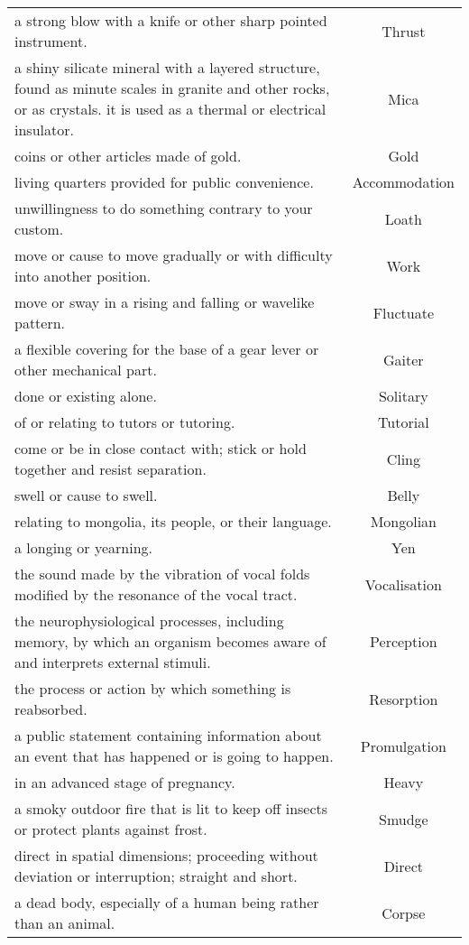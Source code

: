 \begin{longtable}{p{12cm}c}
a strong blow with a knife or other sharp pointed instrument. & Thrust\\
a shiny silicate mineral with a layered structure, found as minute scales in granite and other rocks, or as crystals. it is used as a thermal or electrical insulator. & Mica\\
coins or other articles made of gold. & Gold\\
living quarters provided for public convenience. & Accommodation\\
unwillingness to do something contrary to your custom. & Loath\\
move or cause to move gradually or with difficulty into another position. & Work\\
move or sway in a rising and falling or wavelike pattern. & Fluctuate\\
a flexible covering for the base of a gear lever or other mechanical part. & Gaiter\\
done or existing alone. & Solitary\\
of or relating to tutors or tutoring. & Tutorial\\
come or be in close contact with; stick or hold together and resist separation. & Cling\\
swell or cause to swell. & Belly\\
relating to mongolia, its people, or their language. & Mongolian\\
a longing or yearning. & Yen\\
the sound made by the vibration of vocal folds modified by the resonance of the vocal tract. & Vocalisation\\
the neurophysiological processes, including memory, by which an organism becomes aware of and interprets external stimuli. & Perception\\
the process or action by which something is reabsorbed. & Resorption\\
a public statement containing information about an event that has happened or is going to happen. & Promulgation\\
in an advanced stage of pregnancy. & Heavy\\
a smoky outdoor fire that is lit to keep off insects or protect plants against frost. & Smudge\\
direct in spatial dimensions; proceeding without deviation or interruption; straight and short. & Direct\\
a dead body, especially of a human being rather than an animal. & Corpse\\

\end{longtable}
